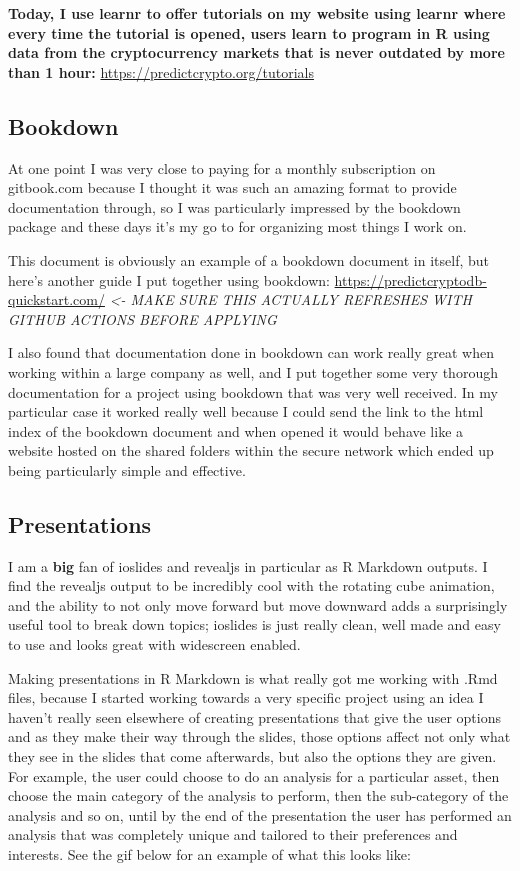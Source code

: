\documentclass[
]{book}
\begin{document}
\textbf{Today, I use learnr to offer tutorials on my website using learnr where every time the tutorial is opened, users learn to program in R using data from the cryptocurrency markets that is never outdated by more than 1 hour:} \url{https://predictcrypto.org/tutorials}

\hypertarget{bookdown}{%
\subsection{Bookdown}\label{bookdown}}

At one point I was very close to paying for a monthly subscription on gitbook.com because I thought it was such an amazing format to provide documentation through, so I was particularly impressed by the bookdown \citep{R-bookdown} package and these days it's my go to for organizing most things I work on.

This document is obviously an example of a bookdown document in itself, but here's another guide I put together using bookdown: \url{https://predictcryptodb-quickstart.com/} \emph{\textless- MAKE SURE THIS ACTUALLY REFRESHES WITH GITHUB ACTIONS BEFORE APPLYING}

I also found that documentation done in bookdown can work really great when working within a large company as well, and I put together some very thorough documentation for a project using bookdown that was very well received. In my particular case it worked really well because I could send the link to the html index of the bookdown document and when opened it would behave like a website hosted on the shared folders within the secure network which ended up being particularly simple and effective.

\hypertarget{presentations}{%
\subsection{Presentations}\label{presentations}}

I am a \textbf{big} fan of ioslides and revealjs in particular as R Markdown outputs. I find the revealjs output to be incredibly cool with the rotating cube animation, and the ability to not only move forward but move downward adds a surprisingly useful tool to break down topics; ioslides is just really clean, well made and easy to use and looks great with widescreen enabled.

Making presentations in R Markdown is what really got me working with .Rmd files, because I started working towards a very specific project using an idea I haven't really seen elsewhere of creating presentations that give the user options and as they make their way through the slides, those options affect not only what they see in the slides that come afterwards, but also the options they are given. For example, the user could choose to do an analysis for a particular asset, then choose the main category of the analysis to perform, then the sub-category of the analysis and so on, until by the end of the presentation the user has performed an analysis that was completely unique and tailored to their preferences and interests. See the gif below for an example of what this looks like:
\end{document}
